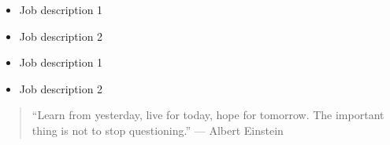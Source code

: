 \documentclass[10pt,a4paper,ragged2e,withhyper]{altacv}
\begin{document}
\begin{paracol}{2}
\begin{itemize}
\item Job description 1
\item Job description 2
\end{itemize}

\divider

\begin{itemize}
\item Job description 1
\item Job description 2
\end{itemize}

\nocite{*}

% 
% 
% 
% 

\switchcolumn


\begin{quote}
``Learn from yesterday, live for today, hope for tomorrow. The important thing is not to stop questioning.''
— Albert Einstein
\end{quote}

\medskip

% 
% 
% 
% 
% 




\end{paracol}
\end{document}
